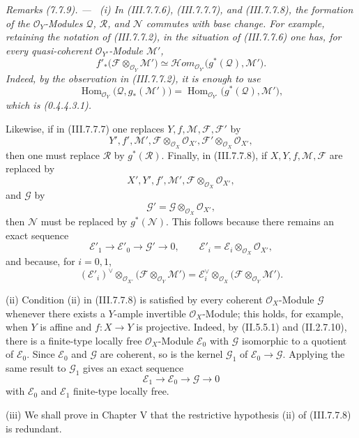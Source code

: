 \documentclass[10pt,oneside]{book}
\newcommand{\sh}[1]{\mathscr{#1}}
\newcommand{\Hom}{\operatorname{Hom}}
\newcommand{\shHom}{\mathscr{H}\!om}
\newcommand{\sref}[2][]{(#2)}
\newcommand{\oldpage}[2][]{\setcounter{footnote}{0}\marginpar{\scriptsize\textbf{#1}~|~#2}\ignorespaces}
\newenvironment{remarks}[1][]{\par\medskip\noindent\itshape Remarks (#1). ---\ }{\par}
\begin{document}
\oldpage[III]{203}
\begin{remarks}[7.7.9]
\label{III.7.7.9}
\textnormal{(i)}
In \sref{III.7.7.6}, \sref{III.7.7.7}, and
\sref{III.7.7.8}, the formation of the $\sh{O}_Y$-Modules
$\sh{Q}$, $\sh{R}$, and $\sh{N}$ commutes with base change.
For example, retaining the notation of \sref{III.7.7.2}, in
the situation of \sref{III.7.7.6} one has, for every
quasi-coherent $\sh{O}_{Y'}$-Module $\sh{M}'$,
\[
  f'_*
  \bigl(\sh{F}\otimes_{\sh{O}_Y}\sh{M}'\bigr)
  \simeq
  \shHom_{\sh{O}_{Y'}}
  \bigl(g^*(\sh{Q}),\sh{M}'\bigr).
\]
Indeed, by the observation in \sref{III.7.7.2}, it is enough
to use
\[
  \Hom_{\sh{O}_Y}
  \bigl(\sh{Q},g_*(\sh{M}')\bigr)
  =
  \Hom_{\sh{O}_{Y'}}
  \bigl(g^*(\sh{Q}),\sh{M}'\bigr),
\]
which is \sref[0]{0.4.4.3.1}.

Likewise, if in \sref{III.7.7.7} one replaces
$Y,f,\sh{M},\sh{F},\sh{F}'$ by
\[
  Y',f',\sh{M}',
  \sh{F}\otimes_{\sh{O}_X}\sh{O}_{X'},
  \sh{F}'\otimes_{\sh{O}_X}\sh{O}_{X'},
\]
then one must replace $\sh{R}$ by $g^*(\sh{R})$.
Finally, in \sref{III.7.7.8}, if
$X,Y,f,\sh{M},\sh{F}$ are replaced by
\[
  X',Y',f',\sh{M}',
  \sh{F}\otimes_{\sh{O}_X}\sh{O}_{X'},
\]
and $\sh{G}$ by
\[
  \sh{G}'
  =
  \sh{G}\otimes_{\sh{O}_X}\sh{O}_{X'},
\]
then $\sh{N}$ must be replaced by $g^*(\sh{N})$.  This
follows because there remains an exact sequence
\[
  \sh{E}'_1\longrightarrow
  \sh{E}'_0\longrightarrow
  \sh{G}'\longrightarrow0,
  \qquad
  \sh{E}'_i
  =
  \sh{E}_i\otimes_{\sh{O}_X}\sh{O}_{X'},
\]
and because, for $i=0,1$,
\[
  (\sh{E}'_i)^\vee
  \otimes_{\sh{O}_{X'}}
  \bigl(\sh{F}\otimes_{\sh{O}_Y}\sh{M}'\bigr)
  =
  \sh{E}_i^\vee
  \otimes_{\sh{O}_X}
  \bigl(\sh{F}\otimes_{\sh{O}_Y}\sh{M}'\bigr).
\]

\medskip
\textnormal{(ii)}
Condition (ii) in \sref{III.7.7.8} is satisfied by every
coherent $\sh{O}_X$-Module $\sh{G}$ whenever there exists a
$Y$-ample invertible $\sh{O}_X$-Module; this holds, for
example, when $Y$ is affine and $f:X\to Y$ is projective.
Indeed, by \sref[II]{II.5.5.1} and \sref[II]{II.2.7.10},
there is a finite-type locally free $\sh{O}_X$-Module
$\sh{E}_0$ with $\sh{G}$ isomorphic to a quotient of
$\sh{E}_0$.  Since $\sh{E}_0$ and $\sh{G}$ are coherent, so
is the kernel $\sh{G}_1$ of $\sh{E}_0\to\sh{G}$.  Applying
the same result to $\sh{G}_1$ gives an exact sequence
\[
  \sh{E}_1\longrightarrow
  \sh{E}_0\longrightarrow
  \sh{G}\longrightarrow0
\]
with $\sh{E}_0$ and $\sh{E}_1$ finite-type locally free.

\medskip
\textnormal{(iii)}
We shall prove in Chapter V that the restrictive hypothesis
(ii) of \sref{III.7.7.8} is redundant.
\end{remarks}
\end{document}
